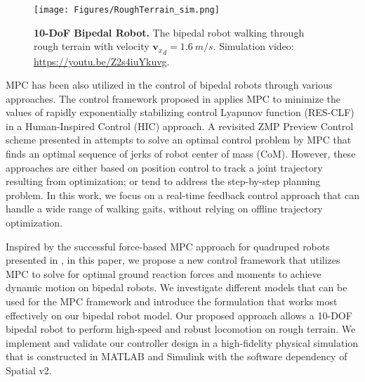 \begin{figure}[t]
		\center
		\texttt{[image: Figures/RoughTerrain\_sim.png]}
		\caption{{\bfseries 10-DoF Bipedal Robot.} The bipedal robot walking through rough terrain with velocity $ {{\bm v}_x}_d=1.6\:\unit{m/s}$. Simulation video: \protect\url{https://youtu.be/Z2s4iuYkuvg}. }
		\label{fig:roughTerrainSim}
	\end{figure}
	
MPC has been also utilized in the control of bipedal robots through various approaches. The control framework proposed in  \cite{powell2015model} applies MPC to minimize the values of rapidly exponentially stabilizing control Lyapunov function (RES-CLF) in a Human-Inspired Control (HIC) approach. A revisited ZMP Preview Control scheme presented in \cite{wieber2006trajectory} attempts to solve an optimal control problem by MPC that finds an optimal sequence of jerks of robot center of mass (CoM). 
However, these approaches are either based on position control to track a joint trajectory resulting from optimization; or tend to address the step-by-step planning problem. In this work, we focus on a real-time feedback control approach that can handle a wide range of walking gaits, without relying on offline trajectory optimization.

Inspired by the successful force-based MPC approach for quadruped robots presented in \cite{di2018dynamic}, in this paper, we propose a new control framework that utilizes MPC to solve for optimal ground reaction forces and moments to achieve dynamic motion on bipedal robots. We investigate different models that can be used for the MPC framework and introduce the formulation that works most effectively on our bipedal robot model. Our proposed approach allows a 10-DOF bipedal robot to perform high-speed and robust locomotion on rough terrain. We implement and validate our controller design in a high-fidelity physical simulation that is constructed in MATLAB and Simulink with the software dependency of Spatial v2.     


